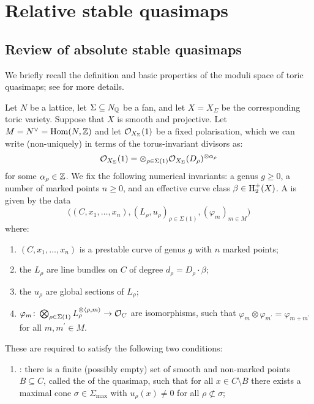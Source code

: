 \section{Relative stable quasimaps} \label{Section relative stable quasimaps}

\subsection{Review of absolute stable quasimaps} \label{Subsection stable quasimaps}
We briefly recall the definition and basic properties of the moduli space of toric quasimaps; see \cite{CF-K} for more details.
\begin{definition}\cite[Definition 3.1.1]{CF-K} Let $N$ be a lattice, let $\Sigma \subseteq N_{\mathbb{Q}}$ be a fan, and let $X= X_{\Sigma}$ be the corresponding toric variety.  Suppose that $X$ is smooth and projective.   Let $M = N^\vee = \operatorname{Hom}(N,\mathbb{Z})$ and let $\mathcal{O}_{X_\Sigma}(1)$ be a fixed polarisation, which we can write (non-uniquely) in terms of the torus-invariant divisors as:
\begin{equation*} \mathcal{O}_{X_\Sigma}(1) = \otimes_{\rho \in \Sigma(1)} \mathcal{O}_{X_\Sigma}(D_\rho)^{\otimes \alpha_\rho} \end{equation*}
for some $\alpha_\rho \in \mathbb{Z}$. We fix the following numerical invariants: a genus $g \geq 0$, a number of marked points $n \geq 0$, and an effective curve class $\beta \in \operatorname{H}_2^+(X)$. A  is given by the data
\begin{equation*} \Big((C,x_1,\ldots,x_n), (L_\rho,u_\rho)_{\rho \in \Sigma(1)}, (\varphi_m)_{m \in M}\Big) \end{equation*}
where:
\begin{enumerate}
\item $(C,x_1,\ldots,x_n)$ is a prestable curve of genus $g$ with $n$ marked points;
\item the $L_\rho$ are line bundles on $C$ of degree $d_\rho = D_\rho \cdot \beta$;
\item the $u_\rho$ are global sections of $L_\rho$;
\item $\varphi_m \colon \bigotimes_{\rho \in \Sigma(1)} L_\rho^{\otimes \langle \rho, m \rangle} \rightarrow \mathcal{O}_C$ are isomorphisms, such that $\varphi_{m} \otimes \varphi_{m^\prime} = \varphi_{m + m^\prime}$ for all $m, m^\prime \in M$.
\end{enumerate}
These are required to satisfy the following two conditions:
\begin{enumerate}
\item {}: there is a finite (possibly empty) set of smooth and non-marked points $B \subseteq C$, called the  of the quasimap, such that for all $x \in C \setminus B$ there exists a maximal cone $\sigma \in \Sigma_{\operatorname{max}}$ with $u_\rho(x) \neq 0$ for all $\rho \not\subset \sigma$;

\end{enumerate}
\end{definition}

